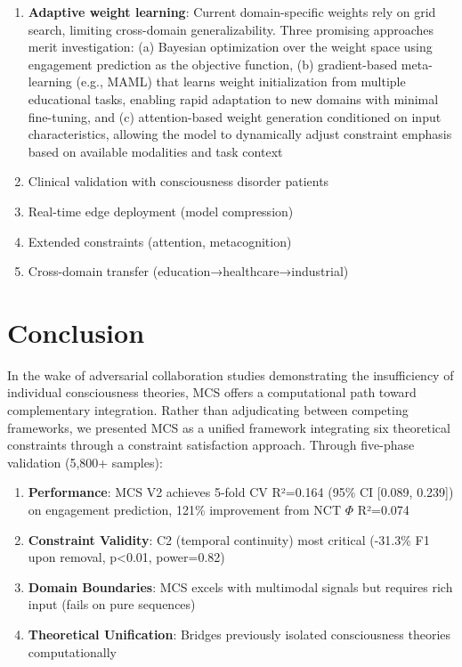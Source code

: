 \documentclass[10pt,journal,compsoc]{IEEEtran}
\begin{document}
\begin{enumerate}
    \item \textbf{Adaptive weight learning}: Current domain-specific weights rely on grid search, limiting cross-domain generalizability. Three promising approaches merit investigation: (a) Bayesian optimization over the weight space using engagement prediction as the objective function, (b) gradient-based meta-learning (e.g., MAML) that learns weight initialization from multiple educational tasks, enabling rapid adaptation to new domains with minimal fine-tuning, and (c) attention-based weight generation conditioned on input characteristics, allowing the model to dynamically adjust constraint emphasis based on available modalities and task context
    \item Clinical validation with consciousness disorder patients
    \item Real-time edge deployment (model compression)
    \item Extended constraints (attention, metacognition)
    \item Cross-domain transfer (education→healthcare→industrial)
\end{enumerate}

\section{Conclusion}
\label{sec:conclusion}

In the wake of adversarial collaboration studies demonstrating the insufficiency of individual consciousness theories, MCS offers a computational path toward complementary integration. Rather than adjudicating between competing frameworks, we presented MCS as a unified framework integrating six theoretical constraints through a constraint satisfaction approach. Through five-phase validation (5,800+ samples):

\begin{enumerate}
    \item \textbf{Performance}: MCS V2 achieves 5-fold CV R²=0.164 (95\% CI [0.089, 0.239]) on engagement prediction, 121\% improvement from NCT $\Phi$ R²=0.074
    \item \textbf{Constraint Validity}: C2 (temporal continuity) most critical (-31.3\% F1 upon removal, p<0.01, power=0.82)
    \item \textbf{Domain Boundaries}: MCS excels with multimodal signals but requires rich input (fails on pure sequences)
    \item \textbf{Theoretical Unification}: Bridges previously isolated consciousness theories computationally
\end{enumerate}
\end{document}
